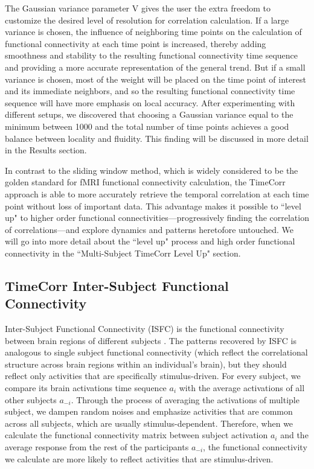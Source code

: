 \documentclass[11pt]{article}
\begin{document}
The Gaussian variance parameter V gives the user the extra freedom to customize the desired level of resolution for correlation calculation. If a large variance is chosen, the influence of neighboring time points on the calculation of functional connectivity at each time point is increased, thereby adding smoothness and stability to the resulting functional connectivity time sequence and providing a more accurate representation of the general trend. But if a small variance is chosen, most of the weight will be placed on the time point of interest and its immediate neighbors, and so the resulting functional connectivity time sequence will have more emphasis on local accuracy. After experimenting with different setups, we discovered that choosing a Gaussian variance equal to the minimum between 1000 and the total number of time points achieves a good balance between locality and fluidity. This finding will be discussed in more detail in the Results section.

In contrast to the sliding window method, which is widely considered to be the golden standard for fMRI functional connectivity calculation, the TimeCorr approach is able to more accurately retrieve the temporal correlation at each time point without loss of important data. This advantage makes it possible to ``level up" to higher order functional connectivities---progressively finding the correlation of correlations---and explore dynamics and patterns heretofore untouched. We will go into more detail about the ``level up" process and high order functional connectivity in the ``Multi-Subject TimeCorr Level Up" section.

\subsection{TimeCorr Inter-Subject Functional Connectivity}

Inter-Subject Functional Connectivity (ISFC) is the functional connectivity between brain regions of different subjects \cite{jeremy2017}\cite{hasson2016}. The patterns recovered by ISFC is analogous to single subject functional connectivity (which reflect the correlational structure across brain regions within an individual's
brain), but they should reflect only activities that are specifically stimulus-driven. For every subject, we compare its brain activations time sequence $a_i$ with the average activations of all other subjects $a_{-i}$. Through the process of averaging the activations of multiple subject, we dampen random noises and emphasize activities that are common across all subjects, which are usually stimulus-dependent. Therefore, when we calculate the functional connectivity matrix between subject activation $a_i$ and the average response from the rest of the participants $a_{-i}$, the functional connectivity we calculate are more likely to reflect activities that are stimulus-driven.
\end{document}
